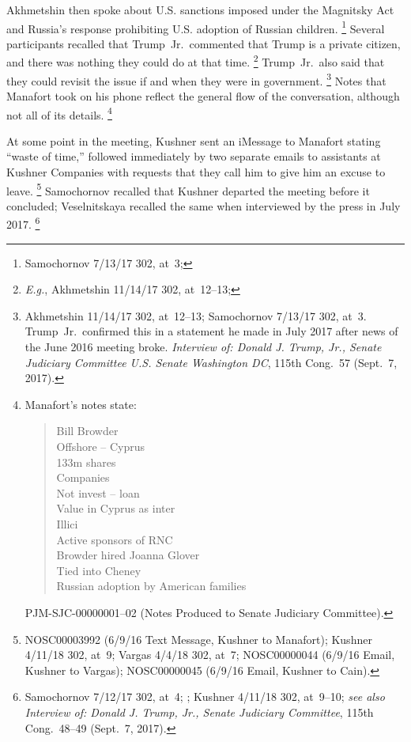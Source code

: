 Akhmetshin then spoke about U.S. sanctions imposed under the Magnitsky Act and Russia's response prohibiting U.S. adoption of Russian children.%
\footnote{Samochornov 7/13/17 302, at~3;
}
Several participants recalled that Trump~Jr.\ commented that Trump is a private citizen, and there was nothing they could do at that time.%
\footnote{\textit{E.g.}, Akhmetshin 11/14/17 302, at~12--13;
}
Trump~Jr.\ also said that they could revisit the issue if and when they were in government.%
\footnote{Akhmetshin 11/14/17 302, at~12--13;
Samochornov 7/13/17 302, at~3.
Trump~Jr.\ confirmed this in a statement he made in July 2017 after news of the June 2016 meeting broke.
\textit{Interview of: Donald J. Trump, Jr., Senate Judiciary Committee U.S. Senate Washington DC}, 115th Cong.~57 (Sept.~7, 2017).}
Notes that Manafort took on his phone reflect the general flow of the conversation, although not all of its details.%
\footnote{Manafort's notes state:

\begin{quote}
Bill Browder \\
Offshore -- Cyprus \\
133m shares \\
Companies \\
Not invest -- loan \\
Value in Cyprus as inter \\
Illici \\
Active sponsors of RNC \\
Browder hired Joanna Glover \\
Tied into Cheney \\
Russian adoption by American families
\end{quote}

PJM-SJC-00000001--02 (Notes Produced to Senate Judiciary Committee).}

At some point in the meeting, Kushner sent an iMessage to Manafort stating ``waste of time,'' followed immediately by two separate emails to assistants at Kushner Companies with requests that they call him to give him an excuse to leave.%
\footnote{NOSC00003992 (6/9/16 Text Message, Kushner to Manafort);
Kushner 4/11/18 302, at~9;
Vargas 4/4/18 302, at~7;
NOSC00000044 (6/9/16 Email, Kushner to Vargas);
NOSC00000045 (6/9/16 Email, Kushner to Cain).}
Samochornov recalled that Kushner departed the meeting before it concluded; Veselnitskaya recalled the same when interviewed by the press in July 2017.%
\footnote{Samochornov 7/12/17 302, at~4;
;
Kushner 4/11/18 302, at~9--10;
\textit{see also Interview of: Donald J. Trump, Jr., Senate Judiciary Committee}, 115th Cong.~48--49 (Sept.~7, 2017).}

